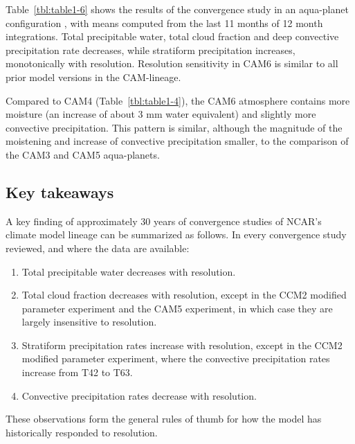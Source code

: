 Table~\ref{tbl:table1-6} shows the results of the convergence study in an aqua-planet configuration \citep[`QOBS' SST profile in][]{NH2000ASL}, with means computed from the last 11 months of 12 month integrations. Total precipitable water, total cloud fraction and deep convective precipitation rate decreases, while stratiform precipitation increases, monotonically with resolution. Resolution sensitivity in CAM6 is similar to all prior model versions in the CAM-lineage. 

Compared to CAM4 (Table~\ref{tbl:table1-4}), the CAM6 atmosphere contains more moisture (an increase of about 3 mm water equivalent) and slightly more convective precipitation. This pattern is similar, although the magnitude of the moistening and increase of convective precipitation smaller, to the comparison of the CAM3 and CAM5 aqua-planets.

\subsection{Key takeaways}

A key finding of approximately 30 years of convergence studies of NCAR's climate model lineage can be summarized as follows. In every convergence study reviewed, and where the data are available:

\begin{enumerate}
\item Total precipitable water decreases with resolution.
\item Total cloud fraction decreases with resolution, except in the CCM2 modified parameter experiment and the CAM5 experiment, in which case they are largely insensitive to resolution.
\item Stratiform precipitation rates increase with resolution, except in the CCM2 modified parameter experiment, where the convective precipitation rates increase from T42 to T63.
\item Convective precipitation rates decrease with resolution.
\end{enumerate}

\noindent These observations form the general rules of thumb for how the model has historically responded to resolution.
